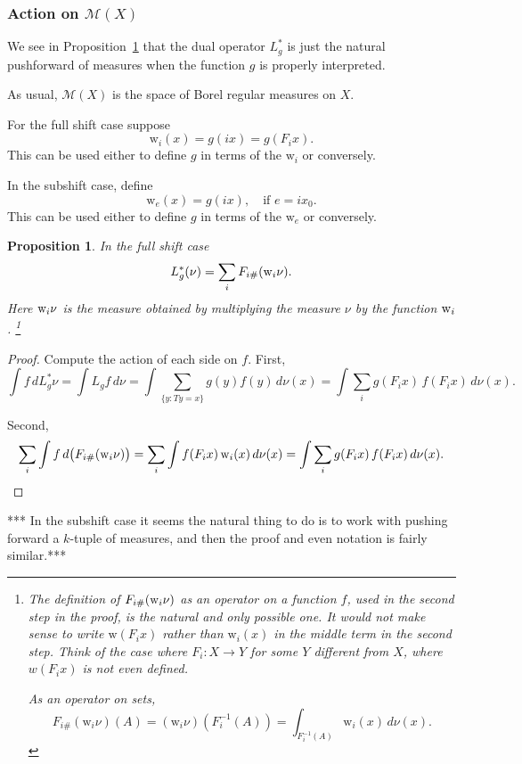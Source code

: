 \documentclass[a4paper]{amsart}
\theoremstyle{plain}
\newtheorem{proposition}[theorem]{Proposition}
\theoremstyle{definition}
\theoremstyle{remark}
\begin{document}
\subsubsection{Action on $ \mathcal{M} (X) $}  \label{secam} We see in Proposition~\ref{lgpf} that the dual operator $ L^*_g $ is just the natural pushforward of measures when the function $ g $ is properly interpreted.

As usual, $ \mathcal{M} (X) $ is the space of Borel regular measures on $ X $.

For the full shift case suppose 
\[   \text{w}_i (x) = g(ix) = g (F_i x).\]
This can be used either to define  $ g $ in terms of the $ \text{w}_i $ or conversely.

In the subshift case, define
\[  \text{w}_e(x) = g(ix), \quad \text{if } e = ix_0. \]
This can be used either to define  $ g $ in terms of the $ \text{w}_e $ or conversely.

\begin{proposition} \label{lgpf}In the full shift case
\[
L^*_g (\nu) = \sum_i F_{i\#}(\textnormal{w}_i\nu ).
\]
Here $ \textnormal{w}_i\nu $ is the \emph{measure} obtained by multiplying the measure $ \nu $ by the  function $ \textnormal{w}_i $.%
\footnote{The definition of $ F_{i\#}(\textnormal{w}_i\nu )$ as an operator on a function $ f $, used in the second step in the proof, is the natural and only possible one.  It would not make sense to write $ \text{w}(F_i x) $ rather than $ \text{w}_i(x) $ in the middle term in the second step.  Think of the case where $ F_i : X \to Y $  for some $ Y $ different from $ X $, where $ w(F_ix) $ is not even defined.

As an operator on sets, 
\[
F_{i\#}(\text{w}_i \nu)(A) = (\text{w}_i\nu)(F_i^{-1}(A))= \int_{F_i^{-1}(A)} \text{w}_i(x)\, d\nu(x).
\]
}

\end{proposition} 

\begin{proof}
 Compute the action of each side on $ f $.
First,
\[
\int f \, dL_g^*\nu   = \int L_g f \, d\nu  
 = \int \sum_{\{y:Ty = x\}} g(y) f(y)\, d\nu(x) 
 = \int \sum_i  g(F_ix)\,  f(F_ix)\, d\nu(x).
\]

Second,
\[
\sum_i \int f\, d\big(F_{i\#}(\textnormal{w}_i\nu )\big)  = \sum_i \int f(F_i x)\, \text{w}_i(x)\, d\nu(x) 
= \int \sum_i  g(F_ix)\, f(F_ix)\, d\nu(x).  \qedhere
\]
\end{proof} 

*** In the subshift case it seems the natural thing to do is to work with pushing forward a $ k$-tuple of measures, and then the proof and even notation is fairly similar.***
\end{document}
